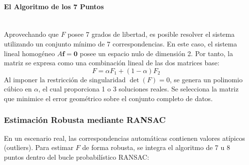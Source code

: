 \documentclass[
10pt, %
a4paper, %
oneside, %
headinclude,footinclude, %
BCOR=5mm, %
]{scrartcl}
\begin{document}
\paragraph{El Algoritmo de los 7 Puntos}~\\
Aprovechando que $F$ posee 7 grados de libertad, es posible resolver el sistema utilizando un conjunto mínimo de 7 correspondencias.
En este caso, el sistema lineal homogéneo $A \mathbf{f} = \mathbf{0}$ posee un espacio nulo de dimensión 2. Por tanto, la matriz se expresa como una combinación lineal de las dos matrices base:
\begin{equation}
    F = \alpha F_1 + (1-\alpha)F_2
\end{equation}
Al imponer la restricción de singularidad $\det(F) = 0$, se genera un polinomio cúbico en $\alpha$, el cual proporciona 1 o 3 soluciones reales. Se selecciona la matriz que minimice el error geométrico sobre el conjunto completo de datos.

\subsubsection{Estimación Robusta mediante RANSAC}
En un escenario real, las correspondencias automáticas contienen valores atípicos (outliers). Para estimar $F$ de forma robusta, se integra el algoritmo de 7 u 8 puntos dentro del bucle probabilístico RANSAC:
\end{document}
